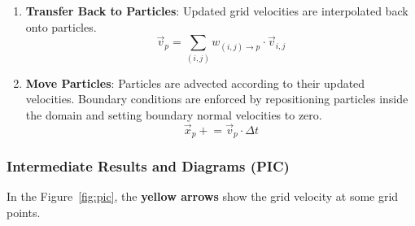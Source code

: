 \begin{enumerate}
\item \textbf{Transfer Back to Particles}: Updated grid velocities are interpolated back onto particles.
\begin{equation}
  \vec{v}_p = \sum_{(i,j)} w_{(i,j) \rightarrow p} \cdot \vec{v}_{i,j}
  \end{equation}

\item \textbf{Move Particles}: Particles are advected according to their updated velocities. Boundary conditions are enforced by repositioning particles inside the domain and setting boundary normal velocities to zero.
\begin{equation}
  \vec{x}_p \mathrel{+}= \vec{v}_p \cdot \Delta t
  \end{equation}
\end{enumerate}

\subsubsection{Intermediate Results and Diagrams (PIC)}

In the Figure~\ref{fig:pic}, the \textbf{yellow arrows} show the grid velocity at some grid points.

